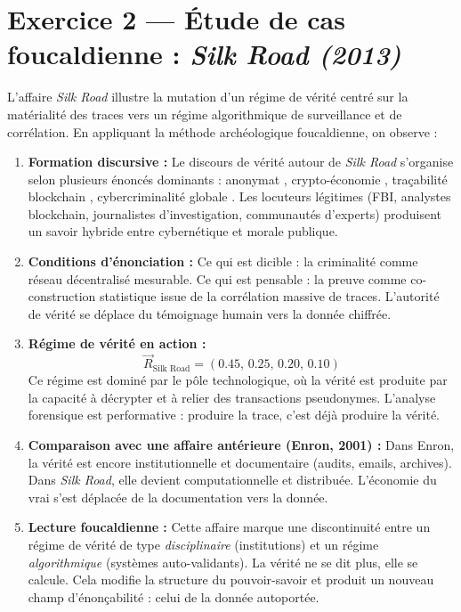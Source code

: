 \documentclass[memoire, 12pt]{report}
\begin{document}
\bigskip

\section{Exercice 2 — Étude de cas foucaldienne : \textit{Silk Road (2013)}}

L’affaire \textit{Silk Road} illustre la mutation d’un régime de vérité centré sur la matérialité des traces vers un régime algorithmique de surveillance et de corrélation. En appliquant la méthode archéologique foucaldienne, on observe :

\begin{enumerate}[label=\textbf{\arabic*.}]
    \item \textbf{Formation discursive :}  
    Le discours de vérité autour de \textit{Silk Road} s’organise selon plusieurs énoncés dominants : \og anonymat \fg, \og crypto-économie \fg, \og traçabilité blockchain \fg, \og cybercriminalité globale \fg. Les locuteurs légitimes (FBI, analystes blockchain, journalistes d’investigation, communautés d’experts) produisent un savoir hybride entre cybernétique et morale publique.
    
    \item \textbf{Conditions d’énonciation :}  
    Ce qui est dicible : la criminalité comme réseau décentralisé mesurable.  
    Ce qui est pensable : la preuve comme co-construction statistique issue de la corrélation massive de traces.  
    L’autorité de vérité se déplace du témoignage humain vers la donnée chiffrée.
    
    \item \textbf{Régime de vérité en action :}  
    \[
    \vec{R}_{\text{Silk Road}} = (0.45,\,0.25,\,0.20,\,0.10)
    \]
    Ce régime est dominé par le pôle technologique, où la vérité est produite par la capacité à décrypter et à relier des transactions pseudonymes. L’analyse forensique est performative : produire la trace, c’est déjà produire la vérité.
    
    \item \textbf{Comparaison avec une affaire antérieure (Enron, 2001) :}  
    Dans Enron, la vérité est encore institutionnelle et documentaire (audits, emails, archives). Dans \textit{Silk Road}, elle devient computationnelle et distribuée. L’économie du vrai s’est déplacée de la documentation vers la donnée.
    
    \item \textbf{Lecture foucaldienne :}  
    Cette affaire marque une discontinuité entre un régime de vérité de type \textit{disciplinaire} (institutions) et un régime \textit{algorithmique} (systèmes auto-validants). La vérité ne se dit plus, elle se calcule. Cela modifie la structure du pouvoir-savoir et produit un nouveau champ d’énonçabilité : celui de la donnée autoportée.
\end{enumerate}
\end{document}
